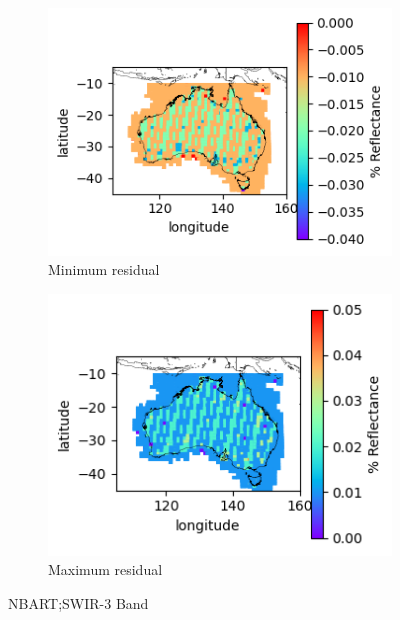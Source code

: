 \documentclass[a4paper]{article}
\begin{document}
      \begin{figure}[h!]
        \centering
          \begin{subfigure}[l]{.4\linewidth}
            \hspace{-32mm}
            \includegraphics[scale=0.9]{plots/nbart/nbart_swir_3-MinResidual.png}
            \caption{Minimum residual}
          \end{subfigure}
%
          \begin{subfigure}[r]{.4\linewidth}
            \includegraphics[scale=0.9]{plots/nbart/nbart_swir_3-MaxResidual.png}
            \caption{Maximum residual}
          \end{subfigure}
        \caption{NBART;\@ SWIR-3 Band}\label{figure:21}
      \end{figure}
\end{document}
